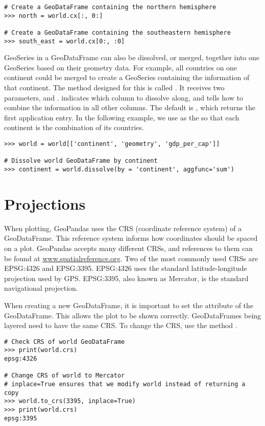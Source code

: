 \begin{lstlisting}
# Create a GeoDataFrame containing the northern hemisphere
>>> north = world.cx[:, 0:]

# Create a GeoDataFrame containing the southeastern hemisphere
>>> south_east = world.cx[0:, :0]
\end{lstlisting}

GeoSeries in a GeoDataFrame can also be dissolved, or merged, together into one GeoSeries based on their geometry data.
For example, all countries on one continent could be merged to create a GeoSeries containing the information of that continent.
The method designed for this is called .
It receives two parameters,  and .
 indicates which column to dissolve along, and  tells how to combine the information in all other columns.
The default  is , which returns the first application entry.
In the following example, we use  as the  so that each continent is the combination of its countries.

\begin{lstlisting}
>>> world = world[['continent', 'geometry', 'gdp_per_cap']]

# Dissolve world GeoDataFrame by continent
>>> continent = world.dissolve(by = 'continent', aggfunc='sum')
\end{lstlisting}

\section*{Projections} %

When plotting, GeoPandas uses the CRS (coordinate reference system) of a GeoDataFrame.
This reference system informs how coordinates should be spaced on a plot.
GeoPandas accepts many different CRSs, and references to them can be found at \url{www.spatialreference.org}.
Two of the most commonly used CRSs are EPSG:4326 and EPSG:3395.
EPSG:4326 uses the standard latitude-longitude projection used by GPS.
EPSG:3395, also known as Mercator, is the standard navigational projection.

When creating a new GeoDataFrame, it is important to set the  attribute of the GeoDataFrame.
This allows the plot to be shown correctly.
GeoDataFrames being layered need to have the same CRS.
To change the CRS, use the method .

\begin{lstlisting}
# Check CRS of world GeoDataFrame
>>> print(world.crs)
epsg:4326

# Change CRS of world to Mercator
# inplace=True ensures that we modify world instead of returning a copy
>>> world.to_crs(3395, inplace=True) 
>>> print(world.crs)
epsg:3395
\end{lstlisting}

